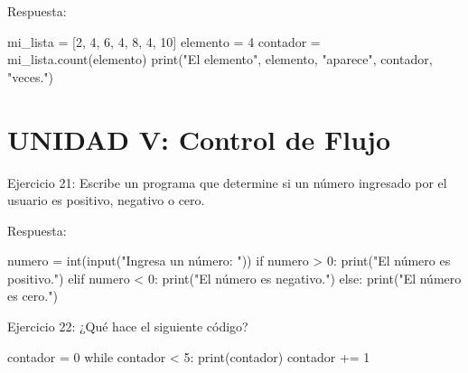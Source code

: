 \documentclass[
  a4paper,
  DIV=11,
  numbers=noendperiod,
  onepage,
  openany]{scrreprt}
\newenvironment{Shaded}{\begin{snugshade}}{\end{snugshade}}
\newcommand{\BuiltInTok}[1]{\textcolor[rgb]{0.00,0.23,0.31}{#1}}
\newcommand{\ControlFlowTok}[1]{\textcolor[rgb]{0.00,0.23,0.31}{#1}}
\newcommand{\DecValTok}[1]{\textcolor[rgb]{0.68,0.00,0.00}{#1}}
\newcommand{\NormalTok}[1]{\textcolor[rgb]{0.00,0.23,0.31}{#1}}
\newcommand{\OperatorTok}[1]{\textcolor[rgb]{0.37,0.37,0.37}{#1}}
\newcommand{\StringTok}[1]{\textcolor[rgb]{0.13,0.47,0.30}{#1}}
\begin{document}
Respuesta:

\begin{Shaded}
\begin{Highlighting}[]
\NormalTok{mi\_lista }\OperatorTok{=}\NormalTok{ [}\DecValTok{2}\NormalTok{, }\DecValTok{4}\NormalTok{, }\DecValTok{6}\NormalTok{, }\DecValTok{4}\NormalTok{, }\DecValTok{8}\NormalTok{, }\DecValTok{4}\NormalTok{, }\DecValTok{10}\NormalTok{]}
\NormalTok{elemento }\OperatorTok{=} \DecValTok{4}
\NormalTok{contador }\OperatorTok{=}\NormalTok{ mi\_lista.count(elemento)}
\BuiltInTok{print}\NormalTok{(}\StringTok{"El elemento"}\NormalTok{, elemento, }\StringTok{"aparece"}\NormalTok{, contador, }\StringTok{"veces."}\NormalTok{)}
\end{Highlighting}
\end{Shaded}

\hypertarget{unidad-v-control-de-flujo-1}{%
\section{UNIDAD V: Control de Flujo}\label{unidad-v-control-de-flujo-1}}

Ejercicio 21: Escribe un programa que determine si un número ingresado
por el usuario es positivo, negativo o cero.

Respuesta:

\begin{Shaded}
\begin{Highlighting}[]
\NormalTok{numero }\OperatorTok{=} \BuiltInTok{int}\NormalTok{(}\BuiltInTok{input}\NormalTok{(}\StringTok{"Ingresa un número: "}\NormalTok{))}
\ControlFlowTok{if}\NormalTok{ numero }\OperatorTok{\textgreater{}} \DecValTok{0}\NormalTok{:}
    \BuiltInTok{print}\NormalTok{(}\StringTok{"El número es positivo."}\NormalTok{)}
\ControlFlowTok{elif}\NormalTok{ numero }\OperatorTok{\textless{}} \DecValTok{0}\NormalTok{:}
    \BuiltInTok{print}\NormalTok{(}\StringTok{"El número es negativo."}\NormalTok{)}
\ControlFlowTok{else}\NormalTok{:}
    \BuiltInTok{print}\NormalTok{(}\StringTok{"El número es cero."}\NormalTok{)}
\end{Highlighting}
\end{Shaded}

Ejercicio 22: ¿Qué hace el siguiente código?

\begin{Shaded}
\begin{Highlighting}[]
\NormalTok{contador }\OperatorTok{=} \DecValTok{0}
\ControlFlowTok{while}\NormalTok{ contador }\OperatorTok{\textless{}} \DecValTok{5}\NormalTok{:}
    \BuiltInTok{print}\NormalTok{(contador)}
\NormalTok{    contador }\OperatorTok{+=} \DecValTok{1}
\end{Highlighting}
\end{Shaded}
\end{document}
